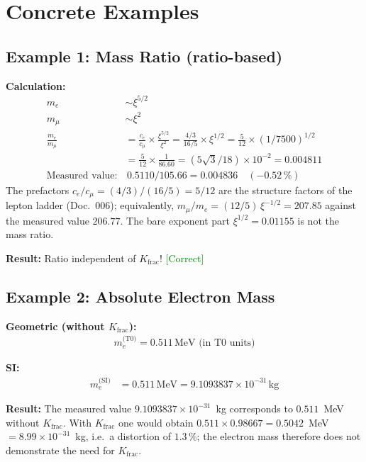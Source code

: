 	\section{Concrete Examples}
	
	\subsection{Example 1: Mass Ratio (ratio-based)}
	
	\textbf{Calculation:}
	\begin{align*}
		m_e &\sim \xi^{5/2} \\
		m_μ &\sim \xi^2 \\
		\frac{m_e}{m_μ} &= \frac{c_e}{c_μ} \times \frac{\xi^{5/2}}{\xi^2} = \frac{4/3}{16/5} \times \xi^{1/2} = \frac{5}{12} \times (1/7500)^{1/2} \\
		&= \frac{5}{12} \times \frac{1}{86.60} = (5\sqrt{3}/18) \times 10^{-2} = 0.004811 \\
		\text{Measured value:} &\, 0.5110/105.66 = 0.004836 \quad (-0.52\,\%)
	\end{align*}
	The prefactors $c_e/c_μ = (4/3)/(16/5) = 5/12$ are the structure factors of the lepton ladder (Doc.~006); equivalently, $m_μ/m_e = (12/5)\,\xi^{-1/2} = 207.85$ against the measured value $206.77$. The bare exponent part $\xi^{1/2} = 0.01155$ is not the mass ratio.
	
	\textbf{Result:} Ratio independent of $K_{\text{frac}}$! \textcolor{green}{[Correct]}
	
	\subsection{Example 2: Absolute Electron Mass}
	
	\textbf{Geometric (without $K_{\text{frac}}$):}
	\begin{align*}
		m_e^{\text{(T0)}} = 0.511\,\text{MeV (in T0 units)}
	\end{align*}
	
	\textbf{SI:}
	\begin{align*}
		m_e^{\text{(SI)}} &= 0.511\,\text{MeV} = 9.1093837 \times 10^{-31}\,\text{kg}
	\end{align*}
	
	\textbf{Result:} The measured value $9.1093837\times10^{-31}$~kg corresponds to $0.511$~MeV without $K_{\text{frac}}$. With $K_{\text{frac}}$ one would obtain $0.511 \times 0.98667 = 0.5042$~MeV $= 8.99\times10^{-31}$~kg, i.e.\ a distortion of $1.3\,\%$; the electron mass therefore does not demonstrate the need for $K_{\text{frac}}$.
	
